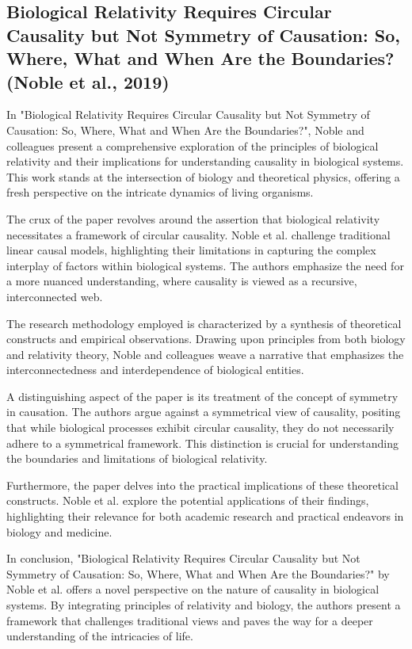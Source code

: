\documentclass[sn-nature]{sn-jnl}%
\theoremstyle{thmstyleone}%
\theoremstyle{thmstyletwo}%
\theoremstyle{thmstylethree}%
\begin{document}
\subsection{Biological Relativity Requires Circular Causality but Not Symmetry of Causation: So, Where, What and When Are the Boundaries? (Noble et al., 2019)\cite{noble_biological_2019}}

In "Biological Relativity Requires Circular Causality but Not Symmetry of Causation: So, Where, What and When Are the Boundaries?", Noble and colleagues present a comprehensive exploration of the principles of biological relativity and their implications for understanding causality in biological systems. This work stands at the intersection of biology and theoretical physics, offering a fresh perspective on the intricate dynamics of living organisms.

The crux of the paper revolves around the assertion that biological relativity necessitates a framework of circular causality. Noble et al. challenge traditional linear causal models, highlighting their limitations in capturing the complex interplay of factors within biological systems. The authors emphasize the need for a more nuanced understanding, where causality is viewed as a recursive, interconnected web.

The research methodology employed is characterized by a synthesis of theoretical constructs and empirical observations. Drawing upon principles from both biology and relativity theory, Noble and colleagues weave a narrative that emphasizes the interconnectedness and interdependence of biological entities.

A distinguishing aspect of the paper is its treatment of the concept of symmetry in causation. The authors argue against a symmetrical view of causality, positing that while biological processes exhibit circular causality, they do not necessarily adhere to a symmetrical framework. This distinction is crucial for understanding the boundaries and limitations of biological relativity.

Furthermore, the paper delves into the practical implications of these theoretical constructs. Noble et al. explore the potential applications of their findings, highlighting their relevance for both academic research and practical endeavors in biology and medicine.

In conclusion, "Biological Relativity Requires Circular Causality but Not Symmetry of Causation: So, Where, What and When Are the Boundaries?" by Noble et al. offers a novel perspective on the nature of causality in biological systems. By integrating principles of relativity and biology, the authors present a framework that challenges traditional views and paves the way for a deeper understanding of the intricacies of life.
\end{document}
